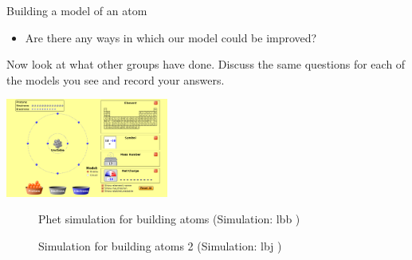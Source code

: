 \begin{groupdiscussion}{Building a model of an atom }
\begin{multicols}{2}
\begin{itemize}[noitemsep]
\label{m38741*uid119}\item Are there any ways in which our model could be improved?
\end{itemize}
        \label{m38741*id260596}Now look at what other groups have done. Discuss the same questions for each of the models you see and record your answers. \par 
\end{multicols}
\begin{center}
 \includegraphics[width=0.4\textwidth]{photos/BuildAtom.png}
\end{center}

\end{groupdiscussion}      
    \setcounter{subfigure}{0}
	\begin{figure}[H] %
    \textnormal{Phet simulation for building atoms}\vspace{.1in} \nopagebreak
  \label{m38806*phet!!!underscore!!!sim}\label{m38806*phet-simulation}
             { (Simulation:  lbb )}
      \vspace{2pt}
    \vspace{.1in}
 \end{figure}       
\par 
    \setcounter{subfigure}{0}
	\begin{figure}[H] %
    \textnormal{Simulation for building atoms 2}\vspace{.1in} \nopagebreak
  \label{m38806*phet!!!underscore!!!sim}\label{m38806*phet-simulation}
             { (Simulation:  lbj )}
      \vspace{2pt}
    \vspace{.1in}
 \end{figure}       
    \par 
    \label{m38741*cid10}
